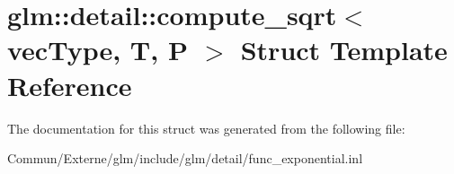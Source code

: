 \hypertarget{structglm_1_1detail_1_1compute__sqrt}{}\section{glm\+:\+:detail\+:\+:compute\+\_\+sqrt$<$ vec\+Type, T, P $>$ Struct Template Reference}
\label{structglm_1_1detail_1_1compute__sqrt}


The documentation for this struct was generated from the following file\+:\begin{DoxyCompactItemize}
\item 
Commun/\+Externe/glm/include/glm/detail/func\+\_\+exponential.\+inl\end{DoxyCompactItemize}
